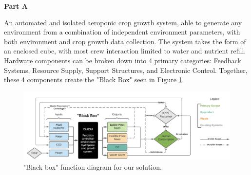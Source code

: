 \documentclass{report}
\begin{document}
\textbf{Part A}
\label{sec:description-a}






An automated and isolated aeroponic crop growth system, able to generate any environment from a combination of independent environment parameters, with both environment and crop growth data collection.
The system takes the form of an enclosed cube, with most crew interaction limited to water and nutrient refill. Hardware components can be broken down into 4 primary categories: Feedback Systems, Resource Supply, Support Structures, and Electronic Control. 
Together, these 4 components create the "Black Box" seen in Figure \ref{fig:blackbox}.

\begin{figure}[h]
    \centering
    \includegraphics[width=15cm]{../solutionoverview/images/blackbox.png}
    \hfill
    \caption{"Black box" function diagram for our solution.}
    \label{fig:blackbox}
\end{figure}
\end{document}

